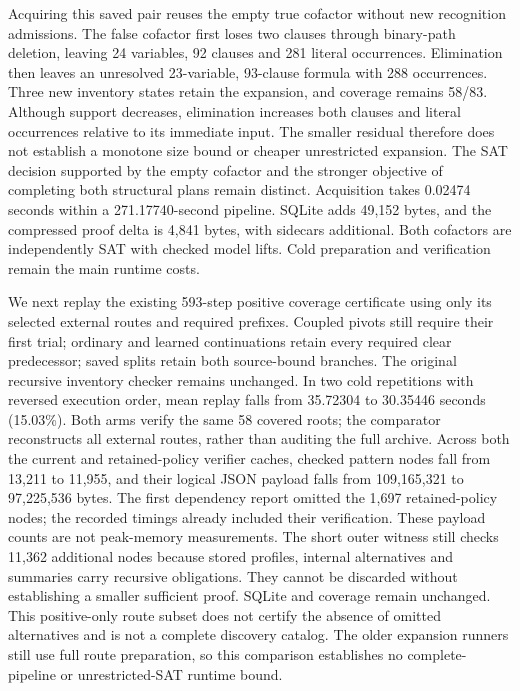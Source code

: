 \documentclass[11pt,a4paper]{article}
\numberwithin{equation}{section}
\theoremstyle{plain}
\theoremstyle{definition}
\theoremstyle{remark}
\begin{document}
Acquiring this saved pair reuses the empty true cofactor without new recognition admissions. The false cofactor first loses two clauses through binary-path deletion, leaving 24 variables, 92 clauses and 281 literal occurrences. Elimination then leaves an unresolved 23-variable, 93-clause formula with 288 occurrences. Three new inventory states retain the expansion, and coverage remains 58/83. Although support decreases, elimination increases both clauses and literal occurrences relative to its immediate input. The smaller residual therefore does not establish a monotone size bound or cheaper unrestricted expansion. The SAT decision supported by the empty cofactor and the stronger objective of completing both structural plans remain distinct. Acquisition takes 0.02474 seconds within a 271.17740-second pipeline. SQLite adds 49,152 bytes, and the compressed proof delta is 4,841 bytes, with sidecars additional. Both cofactors are independently SAT with checked model lifts. Cold preparation and verification remain the main runtime costs.

We next replay the existing 593-step positive coverage certificate using only its selected external routes and required prefixes. Coupled pivots still require their first trial; ordinary and learned continuations retain every required clear predecessor; saved splits retain both source-bound branches. The original recursive inventory checker remains unchanged. In two cold repetitions with reversed execution order, mean replay falls from 35.72304 to 30.35446 seconds (15.03\%). Both arms verify the same 58 covered roots; the comparator reconstructs all external routes, rather than auditing the full archive. Across both the current and retained-policy verifier caches, checked pattern nodes fall from 13,211 to 11,955, and their logical JSON payload falls from 109,165,321 to 97,225,536 bytes. The first dependency report omitted the 1,697 retained-policy nodes; the recorded timings already included their verification. These payload counts are not peak-memory measurements. The short outer witness still checks 11,362 additional nodes because stored profiles, internal alternatives and summaries carry recursive obligations. They cannot be discarded without establishing a smaller sufficient proof. SQLite and coverage remain unchanged. This positive-only route subset does not certify the absence of omitted alternatives and is not a complete discovery catalog. The older expansion runners still use full route preparation, so this comparison establishes no complete-pipeline or unrestricted-SAT runtime bound.
\end{document}

